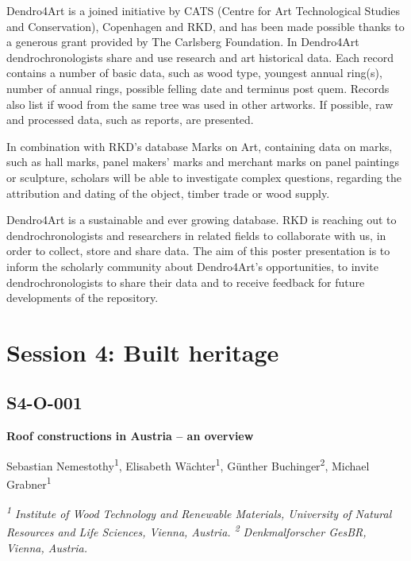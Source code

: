 \documentclass[
]{book}
\begin{document}
Dendro4Art is a joined initiative by CATS (Centre for Art Technological Studies and Conservation), Copenhagen and RKD, and has been made possible thanks to a generous grant provided by The Carlsberg Foundation. In Dendro4Art dendrochronologists share and use research and art historical data. Each record contains a number of basic data, such as wood type, youngest annual ring(s), number of annual rings, possible felling date and terminus post quem. Records also list if wood from the same tree was used in other artworks. If possible, raw and processed data, such as reports, are presented.

In combination with RKD's database Marks on Art, containing data on marks, such as hall marks, panel makers' marks and merchant marks on panel paintings or sculpture, scholars will be able to investigate complex questions, regarding the attribution and dating of the object, timber trade or wood supply.

Dendro4Art is a sustainable and ever growing database. RKD is reaching out to dendrochronologists and researchers in related fields to collaborate with us, in order to collect, store and share data. The aim of this poster presentation is to inform the scholarly community about Dendro4Art's opportunities, to invite dendrochronologists to share their data and to receive feedback for future developments of the repository.

\hypertarget{session-4-built-heritage}{%
\chapter*{Session 4: Built heritage}\label{session-4-built-heritage}}

\hypertarget{s4-o-001}{%
\section*{S4-O-001}\label{s4-o-001}}

\textbf{Roof constructions in Austria -- an overview}

Sebastian Nemestothy\textsuperscript{1}, Elisabeth Wächter\textsuperscript{1}, Günther Buchinger\textsuperscript{2}, Michael Grabner\textsuperscript{1}

\emph{\textsuperscript{1} Institute of Wood Technology and Renewable Materials, University of Natural Resources and Life Sciences, Vienna, Austria. \textsuperscript{2} Denkmalforscher GesBR, Vienna, Austria.}
\end{document}
